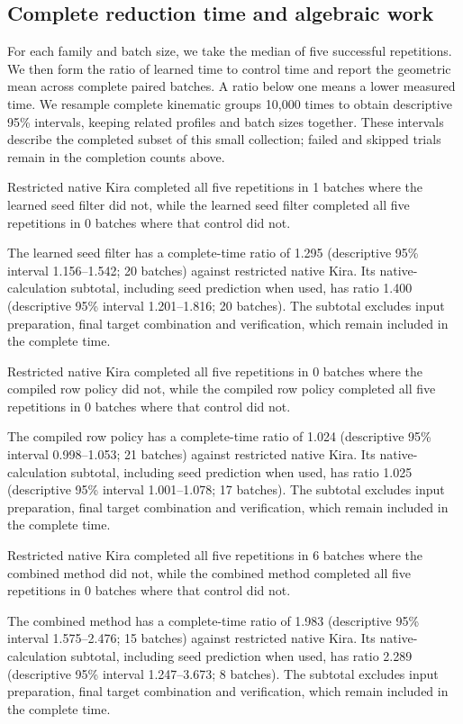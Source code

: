 \subsection{Complete reduction time and algebraic work}

For each family and batch size, we take the median of five successful repetitions. We then form the ratio of learned time to control time and report the geometric mean across complete paired batches. A ratio below one means a lower measured time. We resample complete kinematic groups 10,000 times to obtain descriptive 95\% intervals, keeping related profiles and batch sizes together. These intervals describe the completed subset of this small collection; failed and skipped trials remain in the completion counts above.

Restricted native Kira completed all five repetitions in 1 batches where the learned seed filter did not, while the learned seed filter completed all five repetitions in 0 batches where that control did not.

The learned seed filter has a complete-time ratio of 1.295 (descriptive 95\% interval 1.156--1.542; 20 batches) against restricted native Kira. Its native-calculation subtotal, including seed prediction when used, has ratio 1.400 (descriptive 95\% interval 1.201--1.816; 20 batches). The subtotal excludes input preparation, final target combination and verification, which remain included in the complete time.

Restricted native Kira completed all five repetitions in 0 batches where the compiled row policy did not, while the compiled row policy completed all five repetitions in 0 batches where that control did not.

The compiled row policy has a complete-time ratio of 1.024 (descriptive 95\% interval 0.998--1.053; 21 batches) against restricted native Kira. Its native-calculation subtotal, including seed prediction when used, has ratio 1.025 (descriptive 95\% interval 1.001--1.078; 17 batches). The subtotal excludes input preparation, final target combination and verification, which remain included in the complete time.

Restricted native Kira completed all five repetitions in 6 batches where the combined method did not, while the combined method completed all five repetitions in 0 batches where that control did not.

The combined method has a complete-time ratio of 1.983 (descriptive 95\% interval 1.575--2.476; 15 batches) against restricted native Kira. Its native-calculation subtotal, including seed prediction when used, has ratio 2.289 (descriptive 95\% interval 1.247--3.673; 8 batches). The subtotal excludes input preparation, final target combination and verification, which remain included in the complete time.

